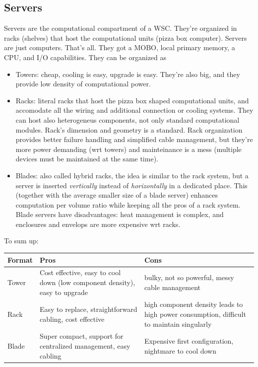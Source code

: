 \documentclass{article}
\begin{document}
			\subsection{Servers}
				Servers are the computational compartment of a WSC. They're organized in racks (shelves) that host the computational units (pizza box computer). Servers are just computers. That's all. They got a MOBO, local primary memory, a CPU, and I/O capabilities. They can be organized as
				\begin{itemize}
					\item Towers: cheap, cooling is easy, upgrade is easy. They're also big, and they provide low density of computational power.
					\item Racks: literal racks that host the pizza box shaped computational units, and accomodate all the wiring and additional connection or cooling systems. They can host also heterogeneus components, not only standard computational modules. Rack's dimension and geometry is a standard. Rack organization provides better failure handling and simplified cable management, but they're more power demanding (wrt towers) and mainteinance is a mess (multiple devices must be maintained at the same time).
					\item Blades: also called hybrid racks, the idea is similar to the rack system, but a server is inserted \emph{vertically} instead of \emph{horizontally} in a dedicated place. This (together with the average smaller size of a blade server) enhances computation per volume ratio while keeping all the pros of a rack system. Blade servers have disadvantages: heat management is complex, and enclosures and envelops are more expensive wrt racks.
				\end{itemize}
				To sum up:
				\begin{center}
					\begin{tabular}{ | m{2cm} || m{5cm} | m{5cm} |}
					\hline
					\textbf{Format} & \textbf{Pros} & \textbf{Cons} \\
					\hline
					\hline
					Tower & Cost effective, easy to cool down (low component density), easy to upgrade & bulky, not so powerful, messy cable management \\
					\hline
					Rack & Easy to replace, straightforward cabling, cost effective & high component density leads to high power consumption, difficult to maintain singularly \\
					\hline
					Blade & Super compact, support for centralized management, easy cabling & Expensive first configuration, nightmare to cool down \\
					\hline
					\end{tabular}
				\end{center}
				
\end{document}
